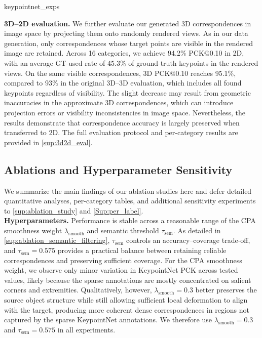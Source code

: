 {keypointnet_exps}

\noindent\textbf{3D--2D evaluation.}
We further evaluate our generated 3D correspondences in image
space by projecting them onto randomly rendered views.
As in our data generation, only correspondences whose target
points are visible in the rendered image are retained.
Across 16 categories, we achieve 94.2\% PCK@0.10 in 2D,
with an average GT-used rate of 45.3\% of ground-truth keypoints in the rendered views.
On the same visible correspondences, 3D PCK@0.10 reaches 95.1\%,
compared to 93\% in the original 3D--3D evaluation,
which includes all found keypoints regardless of visibility.
The slight decrease may result from geometric inaccuracies
in the approximate 3D correspondences, which can introduce
projection errors or visibility inconsistencies in image space.
Nevertheless, the results demonstrate that correspondence
accuracy is largely preserved when transferred to 2D.
The full evaluation protocol and per-category results
are provided in \autoref{sup:3d2d_eval}.

\subsection{Ablations and Hyperparameter Sensitivity}
\label{sec:ablation}
\begingroup
\setlength{\parskip}{0pt}
We summarize the main findings of our ablation studies here and defer detailed quantitative analyses, per-category tables, and additional sensitivity experiments to \autoref{sup:ablation_study} and \autoref{Sup:per_label}.
\\

\noindent\textbf{Hyperparameters.}
Performance is stable across a reasonable range of the CPA smoothness weight \(\lambda_{\mathrm{smooth}}\) and semantic threshold \(\tau_{\mathrm{sem}}\). As detailed in \autoref{sup:ablation_semantic_filtering}, \(\tau_{\mathrm{sem}}\) controls an accuracy--coverage trade-off, and \(\tau_{\mathrm{sem}}=0.575\) provides a practical balance between retaining reliable correspondences and preserving sufficient coverage. For the CPA smoothness weight, we observe only minor variation in KeypointNet \cite{you2020} PCK across tested values, likely because the sparse annotations are mostly concentrated on salient corners and extremities. Qualitatively, however, \(\lambda_{\mathrm{smooth}}=0.3\) better preserves the source object structure while still allowing sufficient local deformation to align with the target, producing more coherent dense correspondences in regions not captured by the sparse KeypointNet annotations. We therefore use \(\lambda_{\mathrm{smooth}}=0.3\) and \(\tau_{\mathrm{sem}}=0.575\) in all experiments.

